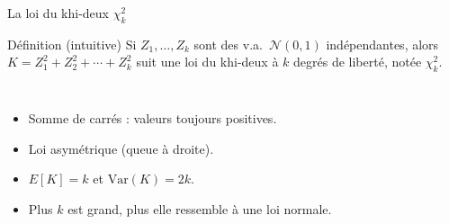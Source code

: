 \documentclass{BeamerTemplate}
\begin{document}
\begin{frame}[t]{La loi du khi-deux $\chi^2_k$}
  \begin{Boite}{Définition (intuitive)}
    Si $Z_1, \ldots, Z_k$ sont des v.a.\ $\mathcal{N}(0,1)$ indépendantes, alors
    $K = Z_1^2 + Z_2^2 + \cdots + Z_k^2$ suit une \alert{loi du khi-deux à $k$ degrés de liberté}, notée $\chi^2_k$.
  \end{Boite}

  \begin{columns}[T]
      \small
      \begin{itemize}\itemsep 2mm
        \item Somme de carrés : valeurs \alert{toujours positives}.
        \item Loi \alert{asymétrique} (queue à droite).
        \item<2-> $E[K] = k$ \quad et \quad $\text{Var}(K) = 2k$.
        \item<2-> Plus $k$ est grand, plus elle ressemble à une loi normale.
      \end{itemize}
      \centering
  \end{columns}
\end{frame}
\end{document}
